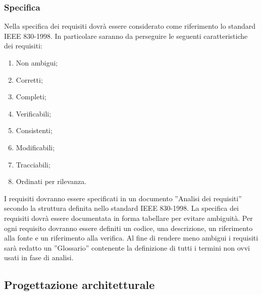 {			\subsubsection{Specifica}{
				Nella specifica dei requisiti dovrà essere considerato come riferimento lo standard IEEE 830-1998. In particolare saranno da perseguire le seguenti caratteristiche dei requisiti:
				\begin{enumerate}
					\item Non ambigui;
					\item Corretti;
					\item Completi;
					\item Verificabili;
					\item Consistenti;
					\item Modificabili;
					\item Tracciabili;
					\item Ordinati per rilevanza.
				\end{enumerate}
				I requisiti dovranno essere specificati in un documento ”Analisi dei requisiti” secondo la struttura definita nello standard IEEE 830-1998. La specifica dei requisiti dovrà essere documentata in forma tabellare per evitare ambiguità. Per ogni requisito dovranno essere definiti un codice, una descrizione, un riferimento alla fonte e un riferimento alla verifica. Al fine di rendere meno ambigui i requisiti sarà redatto un ”Glossario” contenente la definizione di tutti i termini non ovvi usati in fase di analisi.
			}

		}


   \subsection{Progettazione architetturale}
   
